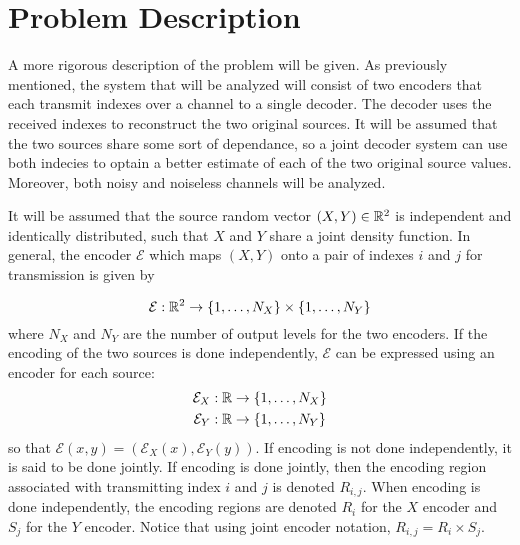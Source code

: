 \section{Problem Description}

A more rigorous description of the problem will be given. As previously mentioned, the system that will be analyzed will consist of two encoders that each transmit indexes over a channel to a single decoder. The decoder uses the received indexes to reconstruct the two original sources. It will be assumed that the two sources share some sort of dependance, so a joint decoder system can use both indecies to optain a better estimate of each of the two original source values. Moreover, both noisy and noiseless channels will be analyzed.

It will be assumed that the source random vector $(X,Y)\in\mathbb{R}^2$ is independent and identically distributed, such that $X$ and $Y$ share a joint density function. In general, the encoder $\mathcal{E}$ which maps $(X,Y)$ onto a pair of indexes $i$ and $j$ for transmission is given by

\begin{equation*}
    \mathcal{E} : \mathbb{R}^2\to\{1,\ldots,N_X\} \times \{1,\ldots,N_Y\}
\end{equation*}
where $N_X$ and $N_Y$ are the number of output levels for the two encoders. If the encoding of the two sources is done independently, $\mathcal{E}$ can be expressed using an encoder for each source:
\begin{gather*}
    \mathcal{E}_X : \mathbb{R}\to\{1,\ldots,N_X\} \\
    \mathcal{E}_Y : \mathbb{R}\to\{1,\ldots,N_Y\}
\end{gather*}
so that $\mathcal{E}(x,y) = (\mathcal{E}_X(x), \mathcal{E}_Y(y))$. If encoding is not done independently, it is said to be done jointly. If encoding is done jointly, then the encoding region associated with transmitting index $i$ and $j$ is denoted $R_{i,j}$. When encoding is done independently, the encoding regions are denoted $R_i$ for the $X$ encoder and $S_j$ for the $Y$ encoder. Notice that using joint encoder notation, $R_{i,j} = R_i \times S_j$.

